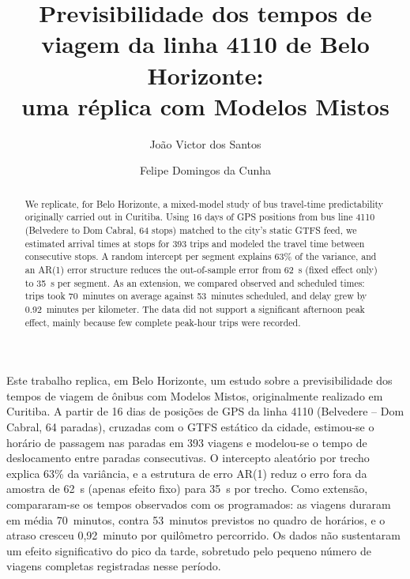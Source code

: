 \documentclass[12pt]{article}
\title{Previsibilidade dos tempos de viagem da linha 4110 de Belo Horizonte:\\
uma réplica com Modelos Mistos}
\author{João Victor dos Santos\inst{1}\and Felipe Domingos da Cunha\inst{1}}
\begin{document}
\maketitle

\begin{abstract}
We replicate, for Belo Horizonte, a mixed-model study of bus travel-time predictability
originally carried out in Curitiba. Using 16 days of GPS positions from bus line 4110
(Belvedere to Dom Cabral, 64 stops) matched to the city's static GTFS feed, we estimated
arrival times at stops for 393 trips and modeled the travel time between consecutive stops.
A random intercept per segment explains 63\% of the variance, and an AR(1) error structure
reduces the out-of-sample error from 62~s (fixed effect only) to 35~s per segment. As an
extension, we compared observed and scheduled times: trips took 70~minutes on average against
53~minutes scheduled, and delay grew by 0.92~minutes per kilometer. The data did not support a
significant afternoon peak effect, mainly because few complete peak-hour trips were recorded.
\end{abstract}

\begin{resumo}
Este trabalho replica, em Belo Horizonte, um estudo sobre a previsibilidade dos tempos de
viagem de ônibus com Modelos Mistos, originalmente realizado em Curitiba. A partir de 16 dias
de posições de GPS da linha 4110 (Belvedere -- Dom Cabral, 64 paradas), cruzadas com o GTFS
estático da cidade, estimou-se o horário de passagem nas paradas em 393 viagens e modelou-se o
tempo de deslocamento entre paradas consecutivas. O intercepto aleatório por trecho explica
63\% da variância, e a estrutura de erro AR(1) reduz o erro fora da amostra de 62~s (apenas
efeito fixo) para 35~s por trecho. Como extensão, compararam-se os tempos observados com os
programados: as viagens duraram em média 70~minutos, contra 53~minutos previstos no quadro de
horários, e o atraso cresceu 0,92~minuto por quilômetro percorrido. Os dados não sustentaram
um efeito significativo do pico da tarde, sobretudo pelo pequeno número de viagens completas
registradas nesse período.
\end{resumo}









\end{document}
